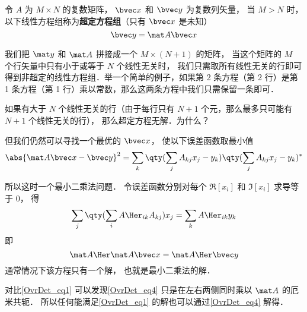 

令 $A$ 为 $M\times N$ 的复数矩阵， $\bvec x$ 和 $\bvec y$ 为复数列矢量， 当 $M > N$ 时， 以下线性方程组称为\textbf{超定方程组}（只有 $\bvec x$ 是未知）
\begin{equation}\label{OvrDet_eq1}
\bvec y = \mat A \bvec x
\end{equation}

我们把 $\mat y$ 和 $\mat A$ 拼接成一个 $M\times(N+1)$ 的矩阵， 当这个矩阵的 $M$ 个行矢量中只有小于或等于 $N$ 个线性无关时， 我们只需取所有线性无关的行即可得到非超定的线性方程组．举一个简单的例子，如果第 2 条方程（第 2 行）是第 1 条方程（第 1 行）乘以常数，那么这两条方程中我们只需保留一条即可．

如果有大于 $N$ 个线性无关的行（由于每行只有 $N+1$ 个元，那么最多只可能有 $N+1$ 个线性无关的行）， 那么超定方程无解．为什么？


但我们仍然可以寻找一个最优的 $\bvec x$， 使以下误差函数取最小值
\begin{equation}
\abs{\mat A\bvec x - \bvec y}^2 =  \sum_k  \qty(\sum_j A_{kj} x_j - y_k) \qty(\sum_j A_{kj} x_j - y_k)^*
\end{equation}

所以这时一个最小二乘法问题． 令误差函数分别对每个 $\Re[x_i]$ 和 $\Im[x_i]$ 求导等于 0， 得
\begin{equation}
\sum_j \qty(\sum_i A\Her_{ik} A_{kj}) x_j = \sum_k A\Her_{ik} y_k
\end{equation}
即
\begin{equation}\label{OvrDet_eq4}
\mat A\Her \mat A \bvec x = \mat A\Her \bvec y
\end{equation}
通常情况下该方程只有一个解， 也就是最小二乘法的解．

对比\autoref{OvrDet_eq1} 可以发现\autoref{OvrDet_eq4} 只是在左右两侧同时乘以 $\mat A$ 的厄米共轭． 所以任何能满足\autoref{OvrDet_eq1} 的解也可以通过\autoref{OvrDet_eq4} 解得．
